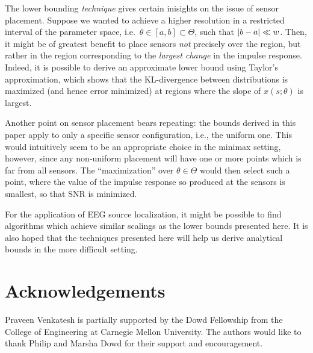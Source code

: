 \documentclass[conference]{IEEEtran}
\DeclarePairedDelimiter\abs{\lvert}{\rvert}
\begin{document}
The lower bounding \emph{technique} gives certain inisights on the issue of
sensor placement. Suppose we wanted to achieve a higher resolution in a
restricted interval of the parameter space, i.e.\ $\theta \in [a, b] \subset
\Theta$, such that $\abs{b - a} \ll w$. Then, it might be of greatest benefit
to place sensors \emph{not} precisely over the region, but rather in the region
corresponding to the \emph{largest change} in the impulse response. Indeed, it
is possible to derive an  approximate lower bound using Taylor's approximation,
which shows that the KL-divergence between distributions is maximized (and
hence error minimized) at regions where the slope of $x(s;\theta)$ is largest.

Another point on sensor placement bears repeating: the bounds derived in this
paper apply to only a specific sensor configuration, i.e., the uniform one.
This would intuitively seem to be an appropriate choice in the minimax setting,
however, since any non-uniform placement will have one or more points which is
far from all sensors. The ``maximization'' over $\theta \in \Theta$ would then
select such a point, where the value of the impulse response so produced at the
sensors is smallest, so that SNR is minimized.

For the application of EEG source localization, it might be possible to find
algorithms which achieve similar scalings as the lower bounds presented here.
It is also hoped that the techniques presented here will help us derive
analytical bounds in the more difficult setting.

\section*{Acknowledgements}

Praveen Venkatesh is partially supported by the Dowd Fellowship from the
College of Engineering at Carnegie Mellon University. The authors would like to
thank Philip and Marsha Dowd for their support and encouragement.




\end{document}

